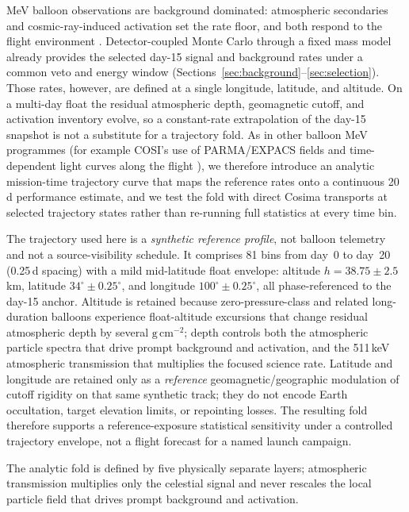 \documentclass[11pt]{article}
\begin{document}
MeV balloon observations are background dominated: atmospheric secondaries and cosmic-ray-induced activation set the rate floor, and both respond to the flight environment \cite{Gallego2025Balloon,Kierans2017}. Detector-coupled Monte Carlo through a fixed mass model already provides the selected day-15 signal and background rates under a common veto and energy window (Sections~\ref{sec:background}--\ref{sec:selection}). Those rates, however, are defined at a single longitude, latitude, and altitude. On a multi-day float the residual atmospheric depth, geomagnetic cutoff, and activation inventory evolve, so a constant-rate extrapolation of the day-15 snapshot is not a substitute for a trajectory fold. As in other balloon MeV programmes (for example COSI's use of PARMA/EXPACS fields and time-dependent light curves along the flight \cite{Gallego2025Balloon}), we therefore introduce an analytic mission-time trajectory curve that maps the reference rates onto a continuous 20\,d performance estimate, and we test the fold with direct Cosima transports at selected trajectory states rather than re-running full statistics at every time bin.

The trajectory used here is a \emph{synthetic reference profile}, not balloon telemetry and not a source-visibility schedule. It comprises 81 bins from day~0 to day~20 (0.25\,d spacing) with a mild mid-latitude float envelope: altitude $h=38.75\pm2.5$\,km, latitude $34^\circ\pm0.25^\circ$, and longitude $100^\circ\pm0.25^\circ$, all phase-referenced to the day-15 anchor. Altitude is retained because zero-pressure-class and related long-duration balloons experience float-altitude excursions that change residual atmospheric depth by several $\mathrm{g\,cm^{-2}}$; depth controls both the atmospheric particle spectra that drive prompt background and activation, and the 511\,keV atmospheric transmission that multiplies the focused science rate. Latitude and longitude are retained only as a \emph{reference} geomagnetic/geographic modulation of cutoff rigidity on that same synthetic track; they do not encode Earth occultation, target elevation limits, or repointing losses. The resulting fold therefore supports a reference-exposure statistical sensitivity under a controlled trajectory envelope, not a flight forecast for a named launch campaign.

The analytic fold is defined by five physically separate layers; atmospheric transmission multiplies only the celestial signal and never rescales the local particle field that drives prompt background and activation.
\end{document}
